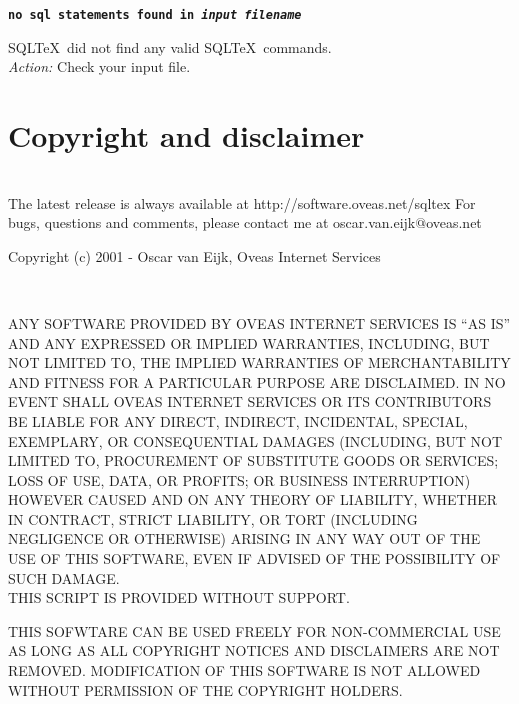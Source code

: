 \documentclass{article}
\newcommand{\vs}{\vspace{3mm}}
\begin{document}
\vs

\noindent\textbf{\texttt{no sql statements found in \textit{input filename}}}

\vspace{1mm}

\noindent SQL\TeX\ did not find any valid SQL\TeX\ commands. \\
\textit{Action:} Check your input file.

\section{Copyright and disclaimer}

\noindent\hrulefill \\
The latest release is always available at http://software.oveas.net/sqltex
For bugs, questions and comments, please contact me at
oscar.van.eijk$@$oveas.net

\vspace{3mm}

\noindent Copyright (c) 2001 - Oscar van Eijk, Oveas Internet Services

\noindent\hrulefill \\

\begin{small}
\noindent ANY SOFTWARE PROVIDED BY OVEAS INTERNET SERVICES IS ``AS IS'' AND ANY
EXPRESSED OR IMPLIED WARRANTIES, INCLUDING, BUT NOT LIMITED TO, THE IMPLIED
WARRANTIES OF MERCHANTABILITY AND FITNESS FOR A PARTICULAR PURPOSE ARE
DISCLAIMED. IN NO EVENT SHALL OVEAS INTERNET SERVICES OR ITS CONTRIBUTORS BE
LIABLE FOR ANY DIRECT, INDIRECT, INCIDENTAL, SPECIAL, EXEMPLARY, OR
CONSEQUENTIAL DAMAGES (INCLUDING, BUT NOT LIMITED TO, PROCUREMENT OF
SUBSTITUTE GOODS OR SERVICES; LOSS OF USE, DATA, OR PROFITS; OR BUSINESS
INTERRUPTION) HOWEVER CAUSED AND ON ANY THEORY OF LIABILITY, WHETHER IN
CONTRACT, STRICT LIABILITY, OR TORT (INCLUDING NEGLIGENCE OR OTHERWISE)
ARISING IN ANY WAY OUT OF THE USE OF THIS SOFTWARE, EVEN IF ADVISED OF
THE POSSIBILITY OF SUCH DAMAGE. \\
THIS SCRIPT IS PROVIDED WITHOUT SUPPORT.

\vspace{2mm}

\noindent THIS SOFWTARE CAN BE USED FREELY FOR NON-COMMERCIAL USE AS LONG AS ALL
COPYRIGHT NOTICES AND DISCLAIMERS ARE NOT REMOVED.
MODIFICATION OF THIS SOFTWARE IS NOT ALLOWED WITHOUT PERMISSION OF THE
COPYRIGHT HOLDERS.
\end{small}
\end{document}
